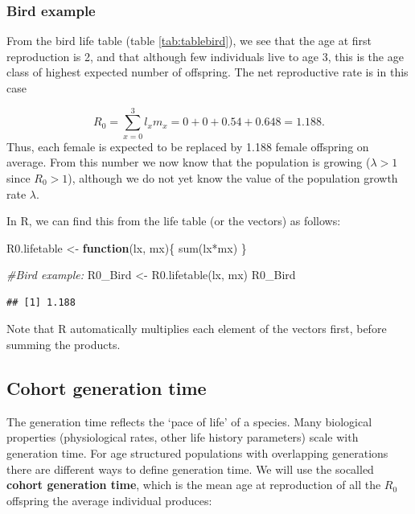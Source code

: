 \documentclass[
]{book}
\newenvironment{Shaded}{\begin{snugshade}}{\end{snugshade}}
\newcommand{\CommentTok}[1]{\textcolor[rgb]{0.56,0.35,0.01}{\textit{#1}}}
\newcommand{\ControlFlowTok}[1]{\textcolor[rgb]{0.13,0.29,0.53}{\textbf{#1}}}
\newcommand{\FunctionTok}[1]{\textcolor[rgb]{0.00,0.00,0.00}{#1}}
\newcommand{\NormalTok}[1]{#1}
\newcommand{\OtherTok}[1]{\textcolor[rgb]{0.56,0.35,0.01}{#1}}
\newcommand{\SpecialCharTok}[1]{\textcolor[rgb]{0.00,0.00,0.00}{#1}}
\begin{document}
\hypertarget{bird-example}{%
\subsubsection*{Bird example}\label{bird-example}}

From the bird life table (table \ref{tab:tablebird}), we see that the age at first reproduction is 2, and that although few individuals live to age 3, this is the age class of highest expected number of offspring. The net reproductive rate is in this case

\[
R_0=\sum_{x=0}^3 l_xm_x=0+0+0.54+0.648=1.188.
\]
Thus, each female is expected to be replaced by 1.188 female offspring on average. From this number we now know that the population is growing (\(\lambda>1\) since \(R_0>1\)), although we do not yet know the value of the population growth rate \(\lambda\).

In R, we can find this from the life table (or the vectors) as follows:

\begin{Shaded}
\begin{Highlighting}[]
\NormalTok{R0.lifetable }\OtherTok{\textless{}{-}} \ControlFlowTok{function}\NormalTok{(lx, mx)\{}
  \FunctionTok{sum}\NormalTok{(lx}\SpecialCharTok{*}\NormalTok{mx) }
\NormalTok{\}}

\CommentTok{\#Bird example:}
\NormalTok{R0\_Bird }\OtherTok{\textless{}{-}} \FunctionTok{R0.lifetable}\NormalTok{(lx, mx) }
\NormalTok{R0\_Bird}
\end{Highlighting}
\end{Shaded}

\begin{verbatim}
## [1] 1.188
\end{verbatim}

Note that R automatically multiplies each element of the vectors first, before summing the products.

\hypertarget{cohort-generation-time}{%
\subsection{Cohort generation time}\label{cohort-generation-time}}

The generation time reflects the `pace of life' of a species. Many biological properties (physiological rates, other life history parameters) scale with generation time. For age structured populations with overlapping generations there are different ways to define generation time. We will use the socalled \textbf{cohort generation time}, which is the mean age at reproduction of all the \(R_0\) offspring the average individual produces:
\end{document}
